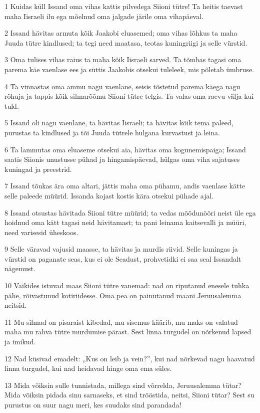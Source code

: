 \par 1 Kuidas küll Issand oma vihas kattis pilvedega Siioni tütre! Ta heitis taevast maha Iisraeli ilu ega mõelnud oma jalgade järile oma vihapäeval.
\par 2 Issand hävitas armuta kõik Jaakobi eluasemed; oma vihas lõhkus ta maha Juuda tütre kindlused; ta tegi need maatasa, teotas kuningriigi ja selle vürstid.
\par 3 Oma tulises vihas raius ta maha kõik Iisraeli sarved. Ta tõmbas tagasi oma parema käe vaenlase ees ja süttis Jaakobis otsekui tuleleek, mis põletab ümbruse.
\par 4 Ta vinnastas oma ammu nagu vaenlane, seisis tõstetud parema käega nagu rõhuja ja tappis kõik silmarõõmu Siioni tütre telgis. Ta valas oma raevu välja kui tuld.
\par 5 Issand oli nagu vaenlane, ta hävitas Iisraeli; ta hävitas kõik tema paleed, purustas ta kindlused ja tõi Juuda tütrele hulgana kurvastust ja leina.
\par 6 Ta lammutas oma eluaseme otsekui aia, hävitas oma kogunemispaiga; Issand saatis Siionis unustusse pühad ja hingamispäevad, hülgas oma viha sajatuses kuningad ja preestrid.
\par 7 Issand tõukas ära oma altari, jättis maha oma pühamu, andis vaenlase kätte selle paleede müürid. Issanda kojast kostis kära otsekui pühade ajal.
\par 8 Issand otsustas hävitada Siioni tütre müürid; ta vedas mõõdunööri neist üle ega hoidnud oma kätt tagasi neid hävitamast; ta pani leinama kaitsevalli ja müüri, need varisesid üheskoos.
\par 9 Selle väravad vajusid maasse, ta hävitas ja murdis riivid. Selle kuningas ja vürstid on paganate seas, kus ei ole Seadust, prohvetidki ei saa seal Issandalt nägemust.
\par 10 Vaikides istuvad maas Siioni tütre vanemad: nad on riputanud enesele tuhka pähe, rõivastunud kotiriidesse. Oma pea on painutanud maani Jeruusalemma neitsid.
\par 11 Mu silmad on pisaraist kibedad, mu sisemus käärib, mu maks on valatud maha mu rahva tütre murdumise pärast. Sest linna turgudel on nõrkenud lapsed ja imikud.
\par 12 Nad küsivad emadelt: „Kus on leib ja vein?”, kui nad nõrkevad nagu haavatud linna turgudel, kui nad heidavad hinge oma ema süles.
\par 13 Mida võiksin sulle tunnistada, millega sind võrrelda, Jeruusalemma tütar? Mida võiksin pidada sinu sarnaseks, et sind trööstida, neitsi, Siioni tütar? Sest su purustus on suur nagu meri, kes suudaks sind parandada!
